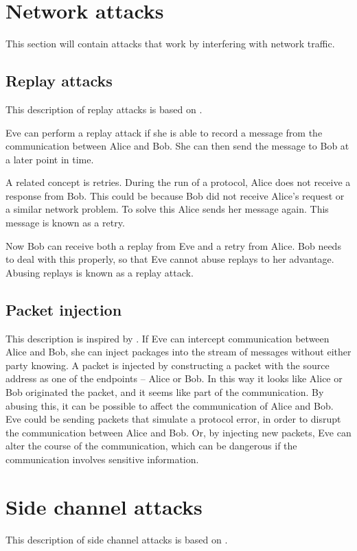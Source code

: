\section{Network attacks}\label{attacks}

This section will contain attacks that work by interfering with network traffic.

\subsection{Replay attacks}\label{replay_attack}
This description of replay attacks is based on \citet[p.~223]{cryptoenginering}.

Eve can perform a replay attack if she is able to record a message from the communication between Alice and Bob.
She can then send the message to Bob at a later point in time. 

A related concept is retries.
During the run of a protocol, Alice does not receive a response from Bob.
This could be because Bob did not receive Alice's request or a similar network problem.
To solve this Alice sends her message again.
This message is known as a retry.

Now Bob can receive both a replay from Eve and a retry from Alice.
Bob needs to deal with this properly, so that Eve cannot abuse replays to her advantage.
Abusing replays is known as a replay attack.

\subsection{Packet injection}\label{attack:packet}
This description is inspired by \citet{packetinjection}.
If Eve can intercept communication between Alice and Bob, she can inject packages into the stream of messages without either party knowing.
A packet is injected by constructing a packet with the source address as one of the endpoints -- Alice or Bob.
In this way it looks like Alice or Bob originated the packet, and it seems like part of the communication.
By abusing this, it can be possible to affect the communication of Alice and Bob.
Eve could be sending packets that simulate a protocol error, in order to disrupt the communication between Alice and Bob.
Or, by injecting new packets, Eve can alter the course of the communication, which can be dangerous if the communication involves sensitive information.

\section{Side channel attacks}\label{attack:sidechannel}
This description of side channel attacks is based on \citet[p.~132]{cryptoenginering}.

